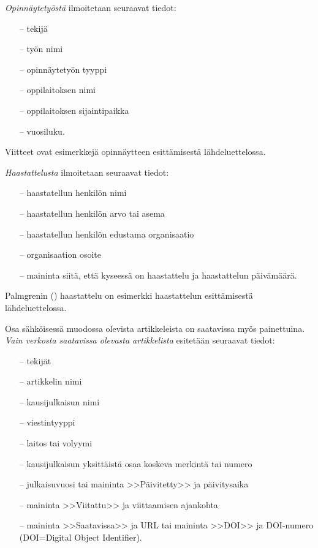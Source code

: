 \documentclass[english, 12pt, a4paper, sci, utf8, a-1b, online]{aaltothesis}
\begin{document}
\textit{Opinnäytetyöstä} ilmoitetaan seuraavat tiedot:

\begin{itemize}
\item[--]tekijä
\item[--]työn nimi
\item[--]opinnäytetyön tyyppi
\item[--]oppilaitoksen nimi
\item[--]oppilaitoksen sijaintipaikka
\item[--]vuosiluku.
\end{itemize}

Viitteet \citep{Miinusmaa,Lonnqvist} ovat esimerkkejä
opinnäytteen esittämisestä lähdeluettelossa. 


\textit{Haastattelusta} ilmoitetaan seuraavat tiedot:

\begin{itemize}
\item[--]haastatellun henkilön nimi
\item[--]haastatellun henkilön arvo tai asema
\item[--]haastatellun henkilön edustama organisaatio
\item[--]organisaation osoite
\item[--]maininta siitä, että kyseessä on haastattelu ja haastattelun
päivämäärä. 
\end{itemize}

Palmgrenin (\citeyear{haastattelu}) haastattelu on esimerkki
haastattelun esittämisestä lähdeluettelossa.

Osa sähköisessä muodossa olevista artikkeleista on saatavissa myös
painettuina. \textit{Vain verkosta saatavissa olevasta artikkelista} esitetään
seuraavat tiedot:

\begin{itemize}
\item[--]tekijät
\item[--]artikkelin nimi
\item[--]kausijulkaisun nimi
\item[--]viestintyyppi
\item[--]laitos tai volyymi
\item[--]kausijulkaisun yksittäistä osaa koskeva merkintä tai numero
\item[--]julkaisuvuosi tai maininta >>Päivitetty>> ja päivitysaika
\item[--]maininta >>Viitattu>> ja viittaamisen ajankohta 
\item[--]maininta >>Saatavissa>> ja URL tai 
        maininta >>DOI>> ja DOI-numero (DOI=Digital Object Identifier).
\end{itemize}
\end{document}
